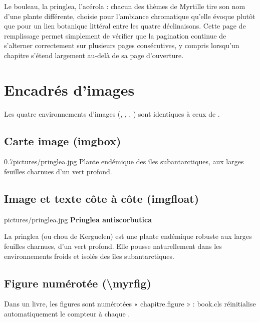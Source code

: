 \documentclass[theme=pringlea]{myrtillebook}
\begin{document}
Le bouleau, la pringlea, l'acérola : chacun des thèmes de Myrtille tire son nom d'une plante différente, choisie pour l'ambiance chromatique qu'elle évoque plutôt que pour un lien botanique littéral entre les quatre déclinaisons. Cette page de remplissage permet simplement de vérifier que la pagination continue de s'alterner correctement sur plusieurs pages consécutives, y compris lorsqu'un chapitre s'étend largement au-delà de sa page d'ouverture.

\chapter{Encadrés d'images}

Les quatre environnements d'images (, , , ) sont identiques à ceux de .

\section{Carte image (imgbox)}
\begin{imgbox}{0.7\linewidth}{pictures/pringlea.jpg}
    Plante endémique des îles subantarctiques, aux larges feuilles charnues d'un vert profond.
\end{imgbox}

\section{Image et texte côte à côte (imgfloat)}
\begin{imgfloat}{pictures/pringlea.jpg}
  \textbf{Pringlea antiscorbutica}

  La pringlea (ou chou de Kerguelen) est une plante endémique robuste aux larges feuilles charnues, d'un vert profond. Elle pousse naturellement dans les environnements froids et isolés des îles subantarctiques.
\end{imgfloat}

\section{Figure numérotée (\textbackslash myrfig)}
Dans un livre, les figures sont numérotées « chapitre.figure » : book.cls réinitialise automatiquement le compteur à chaque .

\end{document}
